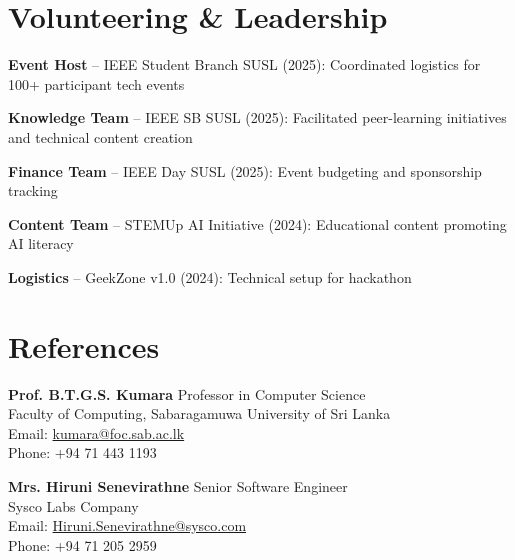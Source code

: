 \documentclass[letterpaper,10pt]{article}
\newenvironment{resume_list}{
  \vspace{-1pt}
  \begin{itemize}[itemsep=2pt, leftmargin=14pt]
}{
  \end{itemize}\vspace{-2pt}
}
\begin{document}
\section{Volunteering \& Leadership}
\vspace{-1pt}
\begin{resume_list}
  \item \textbf{Event Host} – IEEE Student Branch SUSL (2025): Coordinated logistics for 100+ participant tech events
  \item \textbf{Knowledge Team} – IEEE SB SUSL (2025): Facilitated peer-learning initiatives and technical content creation
  \item \textbf{Finance Team} – IEEE Day SUSL (2025): Event budgeting and sponsorship tracking
  \item \textbf{Content Team} – STEMUp AI Initiative (2024): Educational content promoting AI literacy
  \item \textbf{Logistics} – GeekZone v1.0 (2024): Technical setup for hackathon
\end{resume_list}

\vspace{-2pt}
\section{References}
\vspace{-1pt}

\noindent\textbf{Prof. B.T.G.S. Kumara} \hfill Professor in Computer Science\\
\noindent Faculty of Computing, Sabaragamuwa University of Sri Lanka\\
\noindent Email: \href{mailto:kumara@foc.sab.ac.lk}{kumara@foc.sab.ac.lk}\\
\noindent Phone: +94 71 443 1193

\vspace{3pt}
\noindent\textbf{Mrs. Hiruni Senevirathne} \hfill Senior Software Engineer\\
\noindent Sysco Labs Company\\
\noindent Email: \href{mailto:Hiruni.Senevirathne@sysco.com}{Hiruni.Senevirathne@sysco.com}\\
\noindent Phone: +94 71 205 2959
\end{document}
